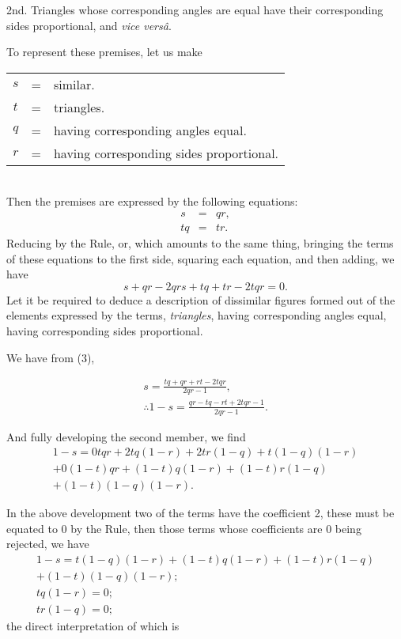 \documentclass[oneside]{book}
\begin{document}
2nd. Triangles whose corresponding angles are equal have
their corresponding sides proportional, and \textit{vice vers\^{a}}.

To represent these premises, let us make \\
\begin{tabular}{c l l}
$s$ &= &similar. \\
$t$ &= &triangles. \\
$q$ &= &having corresponding angles equal. \\
$r$ &= &having corresponding sides proportional. \\
\end{tabular}\\
Then the premises are expressed by the following equations:
\setcounter{equation}{0}
\begin{eqnarray}
s & = & qr, \\
tq & = & tr.
\end{eqnarray}
Reducing by the Rule, or, which amounts to the same thing,
bringing the terms of these equations to the first side, squaring
each equation, and then adding, we have
\begin{equation}
s + qr - 2qrs + tq + tr - 2tqr = 0.
\end{equation}
Let it be required to deduce a description of dissimilar figures
formed out of the elements expressed by the terms, \textit{triangles},
having corresponding angles equal, having corresponding sides
proportional.

We have from (3),

\begin{eqnarray}
s = \frac{tq + qr + rt - 2tqr}{2qr - 1}, \nonumber \\
\therefore 1-s = \frac{qr - tq - rt + 2tqr - 1}{2qr - 1}.
\end{eqnarray}

And fully developing the second member, we find
\begin{eqnarray}
1 - s = 0tqr + 2tq(1 - r) + 2tr(1 - q) + t(1 - q) (1 - r) \nonumber \\
+ 0(1 - t)qr + (1 - t)q(1 -r) + (1 - t)r(1 - q)\nonumber \\
+ (1 - t)(1 - q) (1 - r).
\end{eqnarray}

In the above development two of the terms have the coefficient
2, these must be equated to 0 by the Rule, then those terms
whose coefficients are 0 being rejected, we have
\begin{eqnarray}
1-s=t(1-q)(1-r)+(1-t)q(1-r)+(1-t)r(1-q)\nonumber\\
+(1-t)(1-q)(1-r); \\
tq(1-r)=0; \\
tr(1-q)=0;
\end{eqnarray}
the direct interpretation of which is
\end{document}
